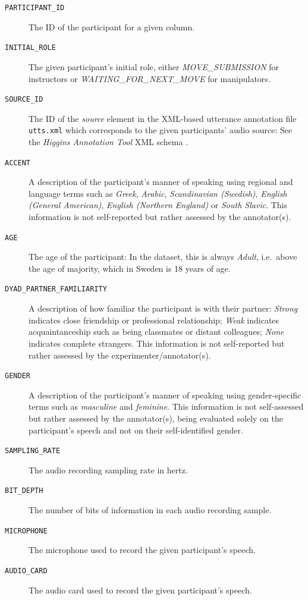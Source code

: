 \documentclass[USenglish]{article}
\newcommand{\lingform}[1]{\emph{#1}}
\newcommand{\inlinecode}[1]{\texttt{#1}}	%
\begin{document}
\begin{description}
	\item[\inlinecode{PARTICIPANT\_ID}] The ID of the participant for a given column.
	\item[\inlinecode{INITIAL\_ROLE}] The given participant's initial role, either \emph{MOVE\_SUBMISSION} for instructors or \emph{WAITING\_FOR\_NEXT\_MOVE} for manipulators.
	\item[\inlinecode{SOURCE\_ID}] The ID of the \emph{source} element in the XML-based utterance annotation file \inlinecode{utts.xml} which corresponds to the given participants' audio source: See the \emph{Higgins Annotation Tool} XML schema \cite{HAT}.
	\item[\inlinecode{ACCENT}] A description of the participant's manner of speaking using regional and language terms such as \lingform{Greek}, \lingform{Arabic}, \lingform{Scandinavian (Swedish)}, \lingform{English (General American)}, \lingform{English (Northern England)} or \lingform{South Slavic}. This information is not self-reported but rather assessed by the annotator(s).
	\item[\inlinecode{AGE}] The age of the participant: In the dataset, this is always \lingform{Adult}, i.e.\ above the age of majority, which in Sweden is 18 years of age.
	\item[\inlinecode{DYAD\_PARTNER\_FAMILIARITY}] A description of how familiar the participant is with their partner: \lingform{Strong} indicates close friendship or professional relationship; \lingform{Weak} indicates acquaintanceship such as being classmates or distant colleagues; \lingform{None} indicates complete strangers. This information is not self-reported but rather assessed by the experimenter\slash annotator(s).
	\item[\inlinecode{GENDER}] A description of the participant's manner of speaking using gender-specific terms such as \lingform{masculine} and \lingform{feminine}. This information is not self-assessed but rather assessed by the annotator(s), being evaluated solely on the participant's speech and not on their self-identified gender.
	\item[\inlinecode{SAMPLING\_RATE}] The audio recording sampling rate in hertz.
	\item[\inlinecode{BIT\_DEPTH}] The number of bits of information in each audio recording sample.
	\item[\inlinecode{MICROPHONE}] The microphone used to record the given participant's speech.
	\item[\inlinecode{AUDIO\_CARD}] The audio card used to record the given participant's speech.

\end{description}
\end{document}
